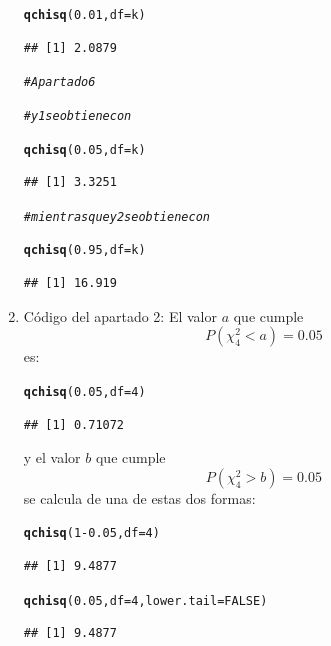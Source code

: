 \documentclass[10pt,a4paper]{article}\usepackage[]{graphicx}\usepackage[]{color}
\makeatletter
\newcommand{\hlnum}[1]{\textcolor[rgb]{0.686,0.059,0.569}{#1}}%
\newcommand{\hlcom}[1]{\textcolor[rgb]{0.678,0.584,0.686}{\textit{#1}}}%
\newcommand{\hlopt}[1]{\textcolor[rgb]{0,0,0}{#1}}%
\newcommand{\hlstd}[1]{\textcolor[rgb]{0.345,0.345,0.345}{#1}}%
\newcommand{\hlkwc}[1]{\textcolor[rgb]{0.333,0.667,0.333}{#1}}%
\newcommand{\hlkwd}[1]{\textcolor[rgb]{0.737,0.353,0.396}{\textbf{#1}}}%
\newenvironment{kframe}{%
 \def\at@end@of@kframe{}%
 \ifinner\ifhmode%
  \def\at@end@of@kframe{\end{minipage}}%
  \begin{minipage}{\columnwidth}%
 \fi\fi%
 \def\FrameCommand##1{\hskip\@totalleftmargin \hskip-\fboxsep
 \colorbox{shadecolor}{##1}\hskip-\fboxsep
     \hskip-\linewidth \hskip-\@totalleftmargin \hskip\columnwidth}%
 \MakeFramed {\advance\hsize-\width
   \@totalleftmargin\z@ \linewidth\hsize
   \@setminipage}}%
 {\par\unskip\endMakeFramed%
 \at@end@of@kframe}
\newenvironment{knitrout}{}{} %
\makeatother
\begin{document}
\begin{enumerate}
\begin{knitrout}
\begin{kframe}
\begin{alltt}
\hlkwd{qchisq}\hlstd{(}\hlnum{0.01}\hlstd{,} \hlkwc{df}\hlstd{=k)}
\end{alltt}
\begin{verbatim}
## [1] 2.0879
\end{verbatim}
\begin{alltt}
\hlcom{# Apartado 6}

\hlcom{# y1 se obtiene con}

\hlkwd{qchisq}\hlstd{(}\hlnum{0.05}\hlstd{,} \hlkwc{df}\hlstd{=k)}
\end{alltt}
\begin{verbatim}
## [1] 3.3251
\end{verbatim}
\begin{alltt}
\hlcom{# mientras que y2 se obtiene con}

\hlkwd{qchisq}\hlstd{(}\hlnum{0.95}\hlstd{,} \hlkwc{df}\hlstd{=k)}
\end{alltt}
\begin{verbatim}
## [1] 16.919
\end{verbatim}
\end{kframe}
\end{knitrout}

  \item Código del apartado 2:
        El valor $a$ que cumple
        \[P(\chi^2_4 < a) = 0.05\]
        es:
\begin{knitrout}
\color{fgcolor}\begin{kframe}
\begin{alltt}
\hlkwd{qchisq}\hlstd{(}\hlnum{0.05}\hlstd{,} \hlkwc{df}\hlstd{=}\hlnum{4}\hlstd{)}
\end{alltt}
\begin{verbatim}
## [1] 0.71072
\end{verbatim}
\end{kframe}
\end{knitrout}
        y el valor $b$ que cumple
        \[P(\chi^2_4 > b) = 0.05\]
        se calcula de una de estas dos formas:
\begin{knitrout}
\color{fgcolor}\begin{kframe}
\begin{alltt}
\hlkwd{qchisq}\hlstd{(}\hlnum{1} \hlopt{-} \hlnum{0.05}\hlstd{,} \hlkwc{df}\hlstd{=}\hlnum{4}\hlstd{)}
\end{alltt}
\begin{verbatim}
## [1] 9.4877
\end{verbatim}
\begin{alltt}
\hlkwd{qchisq}\hlstd{(}\hlnum{0.05}\hlstd{,} \hlkwc{df}\hlstd{=}\hlnum{4}\hlstd{,} \hlkwc{lower.tail}\hlstd{=}\hlnum{FALSE}\hlstd{)}
\end{alltt}
\begin{verbatim}
## [1] 9.4877
\end{verbatim}
\end{kframe}
\end{knitrout}

\end{enumerate}
\end{document}
